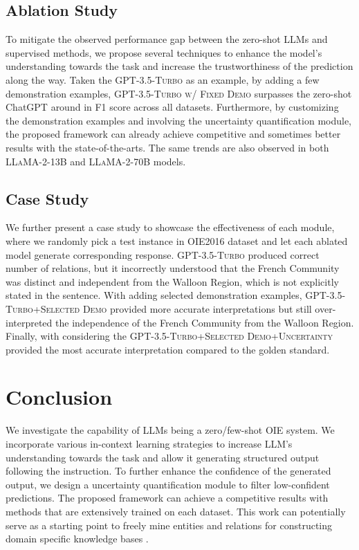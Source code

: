 \documentclass{article}
\begin{document}
\subsection{Ablation Study}
To mitigate the observed performance gap between the zero-shot LLMs and supervised methods, we propose several techniques to enhance the model's understanding towards the task and increase the trustworthiness of the prediction along the way. Taken the \textsc{GPT-3.5-Turbo} as an example, by adding a few demonstration examples, \textsc{GPT-3.5-Turbo w/ Fixed Demo} surpasses the zero-shot ChatGPT around  in F1 score across all datasets. Furthermore, by customizing the demonstration examples and involving the uncertainty quantification module, the proposed framework can already achieve competitive and sometimes better results with the state-of-the-arts. The same trends are also observed in both \textsc{LLaMA-2-13B} and \textsc{LLaMA-2-70B} models.

\subsection{Case Study}
We further present a case study to showcase the effectiveness of each module, where we randomly pick a test instance in OIE2016 dataset and let each ablated model generate corresponding response. \textsc{GPT-3.5-Turbo} produced correct number of relations, but it incorrectly understood that the French Community was distinct and independent from the Walloon Region, which is not explicitly stated in the sentence. With adding selected demonstration examples, \textsc{GPT-3.5-Turbo+Selected Demo} provided more accurate interpretations but still over-interpreted the independence of the French Community from the Walloon Region. Finally, with considering the \textsc{GPT-3.5-Turbo+Selected Demo+Uncertainty} provided the most accurate interpretation compared to the golden standard.

\section{Conclusion}
We investigate the capability of LLMs being a zero/few-shot OIE system. We incorporate various in-context learning strategies to increase LLM's understanding towards the task and allow it generating structured output following the instruction. To further enhance the confidence of the generated output, we design a uncertainty quantification module to filter low-confident predictions. The proposed framework can achieve a competitive results with methods that are extensively trained on each dataset. This work can potentially serve as a starting point to freely mine entities and relations for constructing domain specific knowledge bases \cite{cui2023survey}.



\end{document}
